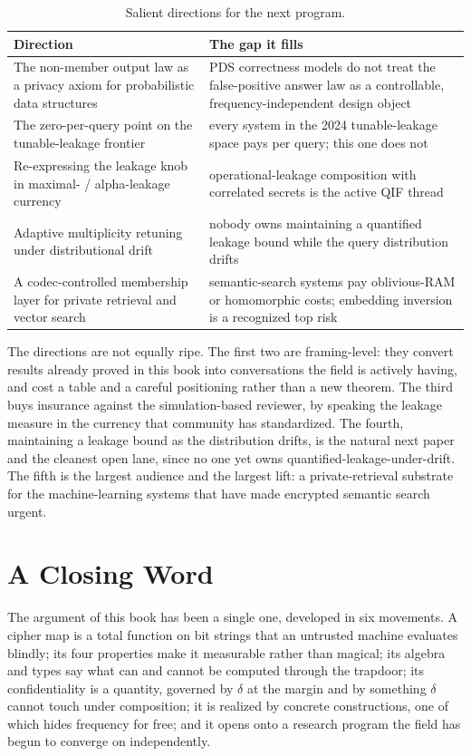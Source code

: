 \begin{table}[t]
\centering
\caption{Salient directions for the next program.}
\label{tab:directions}
\begin{tabular}{@{}p{}p{}@{}}
\toprule
Direction & The gap it fills \\
\midrule
The non-member output law as a privacy axiom for probabilistic data structures
  & PDS correctness models do not treat the false-positive answer law as a controllable, frequency-independent design object \\
The zero-per-query point on the tunable-leakage frontier
  & every system in the 2024 tunable-leakage space pays per query; this one does not \\
Re-expressing the leakage knob in maximal- / alpha-leakage currency
  & operational-leakage composition with correlated secrets is the active QIF thread \\
Adaptive multiplicity retuning under distributional drift
  & nobody owns maintaining a quantified leakage bound while the query distribution drifts \\
A codec-controlled membership layer for private retrieval and vector search
  & semantic-search systems pay oblivious-RAM or homomorphic costs; embedding inversion is a recognized top risk \\
\bottomrule
\end{tabular}
\end{table}

The directions are not equally ripe. The first two are framing-level: they
convert results already proved in this book into conversations the field is
actively having, and cost a table and a careful positioning rather than a new
theorem. The third buys insurance against the simulation-based reviewer, by
speaking the leakage measure in the currency that community has standardized.
The fourth, maintaining a leakage bound as the distribution drifts, is the
natural next paper and the cleanest open lane, since no one yet owns
quantified-leakage-under-drift. The fifth is the largest audience and the
largest lift: a private-retrieval substrate for the machine-learning systems
that have made encrypted semantic search urgent.

\section{A Closing Word}
\label{sec:closing}

The argument of this book has been a single one, developed in six movements.
A cipher map is a total function on bit strings that an untrusted machine
evaluates blindly; its four properties make it measurable rather than
magical; its algebra and types say what can and cannot be computed through
the trapdoor; its confidentiality is a quantity, governed by $\delta$ at the
margin and by something $\delta$ cannot touch under composition; it is
realized by concrete constructions, one of which hides frequency for free;
and it opens onto a research program the field has begun to converge on
independently.

